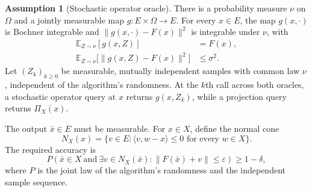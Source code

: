 \documentclass[10pt]{article}
\theoremstyle{definition}
\newtheorem{assumption}{Assumption}
\begin{document}
\begin{assumption}[Stochastic operator oracle]
There is a probability measure $\nu$ on $\Omega$ and a jointly measurable map $g:E\times\Omega\to E$. For every $x\in E$, the map $g(x,\cdot)$ is Bochner integrable and $\|g(x,\cdot)-F(x)\|^2$ is integrable under $\nu$, with
\[
\begin{aligned}
\mathbb{E}_{Z\sim\nu}[g(x,Z)]&=F(x),\\
\mathbb{E}_{Z\sim\nu}\bigl[\|g(x,Z)-F(x)\|^2\bigr]&\leq\sigma^2.
\end{aligned}
\]
Let $(Z_k)_{k\geq0}$ be measurable, mutually independent samples with common law $\nu$, independent of the algorithm's randomness. At the $k$th call across both oracles, a stochastic operator query at $x$ returns $g(x,Z_k)$, while a projection query returns $\Pi_X(x)$.
\end{assumption}

The output $\bar{x}\in E$ must be measurable. For $x\in X$, define the normal cone
\[
N_X(x)=\{v\in E:\langle v,w-x\rangle\leq0
\text{ for every }w\in X\}.
\]
The required accuracy is
\[
P\!\left(\bar{x}\in X\ \text{and}\ 
\exists v\in N_X(\bar{x}):
\|F(\bar{x})+v\|\leq\varepsilon\right)\geq1-\delta,
\]
where $P$ is the joint law of the algorithm's randomness and the independent sample sequence.
\end{document}
